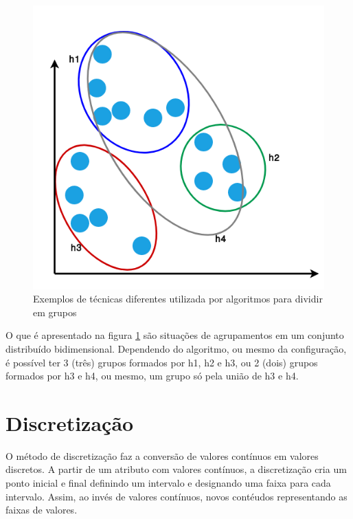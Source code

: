 \begin{figure}[h!]
    \centering
    \includegraphics[scale=0.4]{figs/amostra_dados_AprendNSuperv.png}
    
    
    \caption{Exemplos de técnicas diferentes utilizada por algoritmos para dividir em grupos} 
    \label{fig:planoCartesianoAprendNSup}     
\end{figure}


O que é apresentado na figura \ref{fig:planoCartesianoAprendNSup} são situações de agrupamentos em um conjunto distribuído bidimensional. Dependendo do algoritmo, ou mesmo da configuração, é possível ter 3 (três) grupos formados por h1, h2 e h3, ou 2 (dois) grupos formados por h3 e h4, ou mesmo, um grupo só pela união de h3 e h4. 


\section{Discretização}\label{cap:refTeor:sec:discret}

O método de discretização faz a conversão de valores contínuos em valores discretos. A partir de um atributo com valores contínuos, a discretização cria um ponto inicial e final definindo um intervalo e designando uma faixa para cada intervalo. Assim, ao invés de valores contínuos, novos contéudos representando as faixas de valores.


